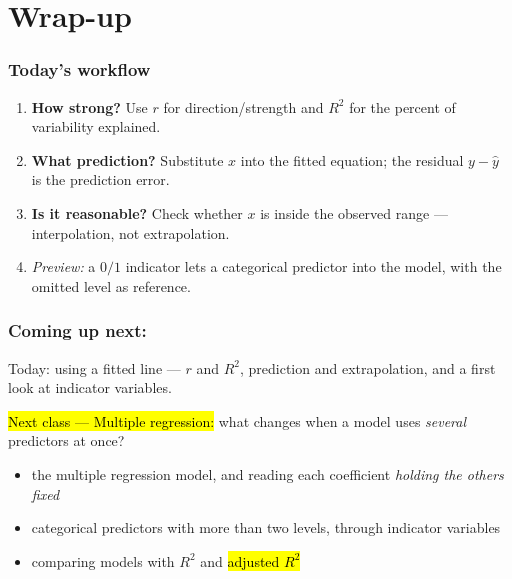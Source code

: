 \documentclass[slidestop,compress,mathserif]{beamer}
\begin{document}
\section{Wrap-up}
\begin{frame}
\frametitle{Today's workflow}

\begin{enumerate}
\item \textbf{How strong?} Use $r$ for direction/strength and $R^2$ for the percent of variability explained.
\item \textbf{What prediction?} Substitute $x$ into the fitted equation; the residual $y-\widehat{y}$ is the prediction error.
\item \textbf{Is it reasonable?} Check whether $x$ is inside the observed range --- interpolation, not extrapolation.
\item \emph{Preview:} a $0/1$ indicator lets a categorical predictor into the model, with the omitted level as reference.
\end{enumerate}

\end{frame}
\begin{frame}
\frametitle{Coming up next:}

Today: using a fitted line --- $r$ and $R^2$, prediction and extrapolation, and a first look at indicator variables.

\vspace{0.5em}
\hl{Next class --- Multiple regression:} what changes when a model uses \emph{several} predictors at once?

\begin{itemize}
\item the multiple regression model, and reading each coefficient \emph{holding the others fixed}
\item categorical predictors with more than two levels, through indicator variables
\item comparing models with $R^2$ and \hl{adjusted $R^2$}
\end{itemize}

\end{frame}

\end{document}
